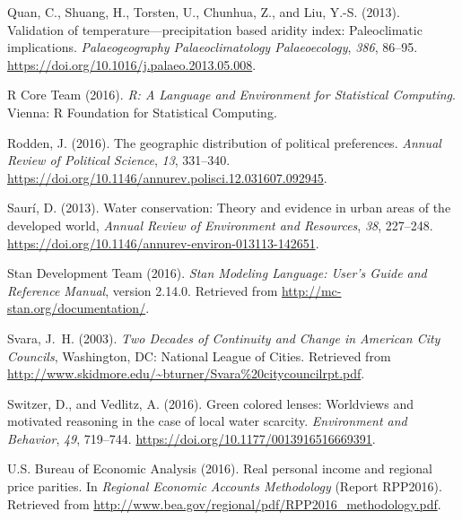 \documentclass[draft,linenumbers]{agujournal}
\begin{document}
\begin{thebibliography}{33}
  Quan, C., Shuang, H., Torsten, U., Chunhua, Z., and Liu, Y.-S. (2013).
  Validation of temperature---precipitation based aridity index: Paleoclimatic
  implications.
  \textit{Palaeogeography Palaeoclimatology Palaeoecology}, \textit{386}, 86--95.
  \url{https://doi.org/10.1016/j.palaeo.2013.05.008}.

  {R Core Team} (2016). \textit{R: A Language and Environment for Statistical
  Computing}.
  Vienna: R Foundation for Statistical Computing.

  Rodden, J. (2016).
  The geographic distribution of political preferences.
  \textit{Annual Review of Political Science}, \textit{13}, 331--340.
  \url{https://doi.org/10.1146/annurev.polisci.12.031607.092945}.

  Saur\'i, D. (2013).
  Water conservation: {T}heory and evidence in urban areas of the developed world,
  \textit{Annual Review of Environment and Resources}, \textit{38}, 227--248.
  \url{https://doi.org/10.1146/annurev-environ-013113-142651}.

  {Stan Development Team} (2016).
  \textit{{S}tan Modeling Language: User's Guide and Reference Manual}, version 2.14.0.
  Retrieved from
  \url{http://mc-stan.org/documentation/}.

  Svara, J.~H. (2003).
  \textit{Two Decades of Continuity and Change in American City Councils},
  Washington, DC: National League of Cities.
  Retrieved from
  \url{http://www.skidmore.edu/~bturner/Svara%20citycouncilrpt.pdf}.

  Switzer, D., and Vedlitz, A. (2016).
  Green colored lenses: Worldviews and motivated reasoning in the case of local
  water scarcity.
  \textit{Environment and Behavior}, \textit{49}, 719--744.
  \url{https://doi.org/10.1177/0013916516669391}.

  U.S. Bureau of Economic Analysis (2016{}).
  Real personal income and regional price parities.
  In \textit{Regional Economic Accounts Methodology\/}
  (Report  RPP2016).
  Retrieved from
  \url{http://www.bea.gov/regional/pdf/RPP2016_methodology.pdf}.


\end{thebibliography}
\end{document}
